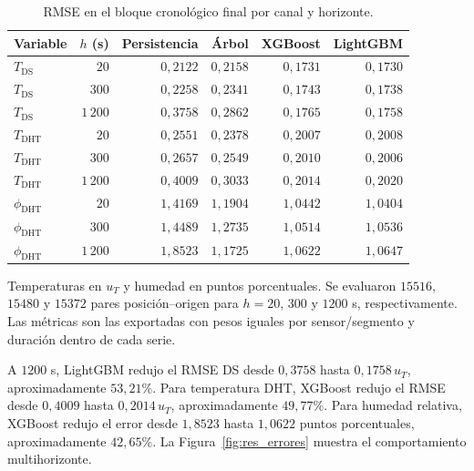\begin{table}[htbp]
\centering
\caption{RMSE en el bloque cronológico final por canal y horizonte.}
\label{tab:res_rmse}
\small
\setlength{\tabcolsep}{5pt}
\begin{tabular}{lrrrrr}
\toprule
Variable & $h$ (s) & Persistencia & Árbol & XGBoost & LightGBM \\
\midrule
$T_{\mathrm{DS}}$ & $20$ & $0{,}2122$ & $0{,}2158$ & $0{,}1731$ & $0{,}1730$ \\
$T_{\mathrm{DS}}$ & $300$ & $0{,}2258$ & $0{,}2341$ & $0{,}1743$ & $0{,}1738$ \\
$T_{\mathrm{DS}}$ & $1\,200$ & $0{,}3758$ & $0{,}2862$ & $0{,}1765$ & $0{,}1758$ \\
$T_{\mathrm{DHT}}$ & $20$ & $0{,}2551$ & $0{,}2378$ & $0{,}2007$ & $0{,}2008$ \\
$T_{\mathrm{DHT}}$ & $300$ & $0{,}2657$ & $0{,}2549$ & $0{,}2010$ & $0{,}2006$ \\
$T_{\mathrm{DHT}}$ & $1\,200$ & $0{,}4009$ & $0{,}3033$ & $0{,}2014$ & $0{,}2020$ \\
$\phi_{\mathrm{DHT}}$ & $20$ & $1{,}4169$ & $1{,}1904$ & $1{,}0442$ & $1{,}0404$ \\
$\phi_{\mathrm{DHT}}$ & $300$ & $1{,}4489$ & $1{,}2735$ & $1{,}0514$ & $1{,}0536$ \\
$\phi_{\mathrm{DHT}}$ & $1\,200$ & $1{,}8523$ & $1{,}1725$ & $1{,}0622$ & $1{,}0647$ \\
\bottomrule
\end{tabular}
\par\vspace{3pt}
\begin{minipage}{0.98\textwidth}\footnotesize
Temperaturas en $u_T$ y humedad en puntos porcentuales. Se evaluaron $15516$, $15480$ y $15372$ pares posición--origen para $h=20$, $300$ y $1200$ s, respectivamente. Las métricas son las exportadas con pesos iguales por sensor/segmento y duración dentro de cada serie.
\end{minipage}
\end{table}


A $1200$ s, LightGBM redujo el RMSE DS desde $0{,}3758$ hasta $0{,}1758\,u_T$, aproximadamente $53{,}21\%$. Para temperatura DHT, XGBoost redujo el RMSE desde $0{,}4009$ hasta $0{,}2014\,u_T$, aproximadamente $49{,}77\%$. Para humedad relativa, XGBoost redujo el error desde $1{,}8523$ hasta $1{,}0622$ puntos porcentuales, aproximadamente $42{,}65\%$. La Figura~\ref{fig:res_errores} muestra el comportamiento multihorizonte.

